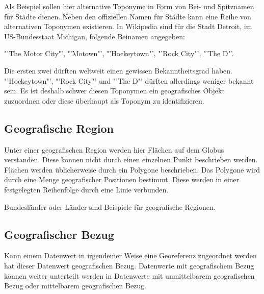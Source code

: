 \begin{description}
			  		Als Beispiel sollen hier alternative Toponyme in Form von Bei- und Spitznamen für Städte dienen.
					Neben den offiziellen Namen für Städte kann eine Reihe von alternativen Toponymen existieren.
					In Wikipedia sind für die Stadt Detroit, im US-Bundesstaat Michigan, folgende Beinamen angegeben: 

					 "'The Motor City"', "'Motown"', "'Hockeytown"', "'Rock City"', "'The D"'.

					Die ersten zwei dürften weltweit einen gewissen Bekanntheitsgrad haben. 
					"'Hockeytown"', "'Rock City"' und "'The D"' dürften allerdings weniger bekannt sein.
					Es ist deshalb schwer diesen Toponymen ein geografisches Objekt zuzuordnen oder diese überhaupt als Toponym zu identifizieren.

			\end{description}  

		\subsection{Geografische Region} 
			
			Unter einer geografischen Region werden hier Flächen auf dem Globus verstanden.
			Diese können nicht durch einen einzelnen Punkt beschrieben werden. 
			Flächen werden üblicherweise durch ein Polygone beschrieben. 
			Das Polygone wird durch eine Menge geografischer Positionen bestimmt.
			Diese werden in einer festgelegten Reihenfolge durch eine Linie verbunden.

			Bundesländer oder Länder sind Beispiele für geografische Regionen.
			
		\subsection{Geografischer Bezug} 

			Kann einem Datenwert in irgendeiner Weise eine Georeferenz zugeordnet werden hat dieser Datenwert geografischen Bezug.
			Datenwerte mit geografischem Bezug können weiter unterteilt werden in Datenwerte mit unmittelbarem geografischen Bezug oder mittelbarem geografischen Bezug. 

